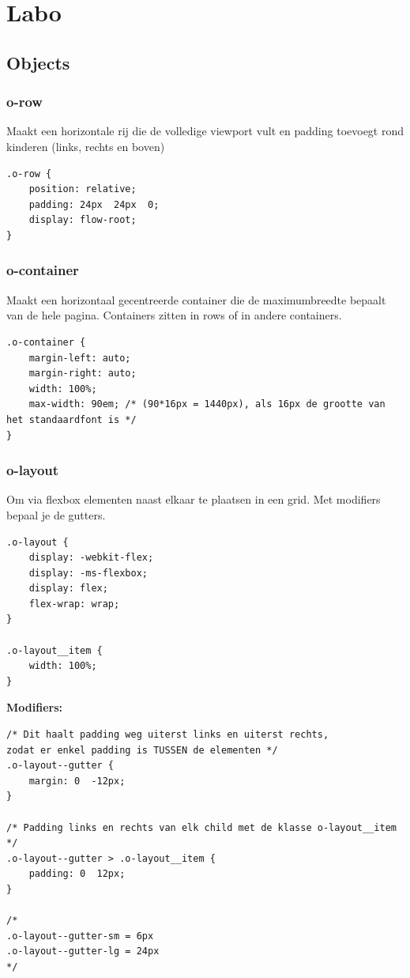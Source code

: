 \documentclass{article}
\newcommand{\bold}[1]{\textbf{#1}}
\begin{document}
\section{Labo}

\subsection{Objects}

\subsubsection{o-row}

Maakt een horizontale rij die de volledige viewport vult en padding toevoegt rond kinderen (links, rechts en boven)

\begin{lstlisting}
.o-row {
    position: relative;
    padding: 24px  24px  0;
    display: flow-root;
}
\end{lstlisting}

\subsubsection{o-container}

Maakt een horizontaal gecentreerde container die de maximumbreedte bepaalt van de hele pagina. Containers zitten in rows of in andere containers.

\begin{lstlisting}
.o-container {
    margin-left: auto;
    margin-right: auto;
    width: 100%;
    max-width: 90em; /* (90*16px = 1440px), als 16px de grootte van het standaardfont is */
}
\end{lstlisting}

\subsubsection{o-layout}

Om via flexbox elementen naast elkaar te plaatsen in een grid. Met modifiers bepaal je de gutters.

\begin{lstlisting}
.o-layout {
    display: -webkit-flex;
    display: -ms-flexbox;
    display: flex;
    flex-wrap: wrap;
}

.o-layout__item {
    width: 100%;
}
\end{lstlisting}


\bold{Modifiers:}

\begin{lstlisting}
/* Dit haalt padding weg uiterst links en uiterst rechts,
zodat er enkel padding is TUSSEN de elementen */
.o-layout--gutter {
    margin: 0  -12px;
}

/* Padding links en rechts van elk child met de klasse o-layout__item */
.o-layout--gutter > .o-layout__item {
    padding: 0  12px;
}

/*
.o-layout--gutter-sm = 6px
.o-layout--gutter-lg = 24px
*/
\end{lstlisting}
\end{document}
